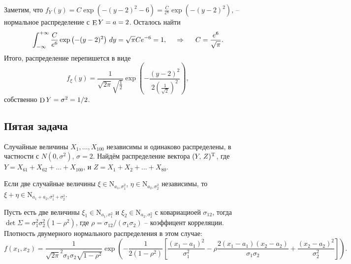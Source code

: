 Заметим, что $f_Y (y) =  C \exp\left(
        - (y-2)^2 - 6
    \right) =  \frac{C}{e^6} \exp\left(
        - (y-2)^2
    \right)$, -- нормальное распределение с $\mathop{\mathrm{E}}\nolimits Y = a = 2$. 
Осталось найти
\begin{equation*}
    \int_{-\infty}^{+\infty} \frac{C}{e^6} \exp\left(
        - (y-2)^2
    \right) \, d y = \sqrt{\pi} C e^{-6} = 1,
    \hspace{0.5cm} \Rightarrow \hspace{0.5cm}
    C = \frac{e^6}{\sqrt{\pi}}.
\end{equation*}
Итого, распределение перепишется в виде
\begin{equation*}
    f_\xi(y) = \frac{1}{\sqrt{2\pi} \sqrt{\frac{1}{2}}} \exp\left(
        - \frac{(y-2)^2}{2 (\frac{1}{\sqrt{2}})^2}
    \right),
\end{equation*}
собственно $\mathop{\mathrm{D}}\nolimits Y = \sigma^2 = 1/2$. 







\subsection*{Пятая задача}



Случайные величины $X_1, \ldots, X_{100}$ независимы и одинаково распределены, в частности с $N(0, \sigma^2)$, $\sigma=2$. Найдём распределение вектора $(Y,\, Z)^{\text{T}}$, где $Y = X_{61} + X_{62} + \ldots + X_{100}$, и $Z = X_1 + X_2 + \ldots + X_{80}$.

 

\begin{to_lem}
    Если две случайные величины $\xi \in \text{N}_{a_1, \sigma_1^2}$, $\eta \in \text{N}_{a_2, \sigma_2^2}$ независимы, то $\xi + \eta \in \text{N}_{a_1 + a_2, \sigma_1^2 + \sigma_2^2}$.
\end{to_lem}

\begin{to_lem}
    Пусть есть две величины $\xi_1 \in \text{N}_{a_1, \sigma_1^2}$ и $\xi_2 \in \text{N}_{a_2, \sigma_2^2}$ с ковариациоей $\sigma_{12}$, тогда $\det \Sigma = \sigma_1^2 \sigma_2^2 (1-\rho^2)$, где $\rho = \sigma_{12}/(\sigma_1 \sigma_2)$ -- коэффицент корреляции. Плотность двумерного нормального распределения в этом случае:
    \begin{equation*}
        f(x_1, x_2) = \frac{1}{\sqrt{2\pi}^2 \sigma_1 \sigma_2 \sqrt{1-\rho^2}} \exp\left(
            - \frac{1}{2(1-\rho^2)} \left[
                \frac{(x_1-a_1)^2}{\sigma_1^2} - \rho \frac{2 (x_1 - a_1)(x_2-a_2)}{\sigma_1 \sigma_2} + \frac{(x_2-a_2)^2}{\sigma_2^2}
            \right]
        \right).
    \end{equation*}
\end{to_lem}


